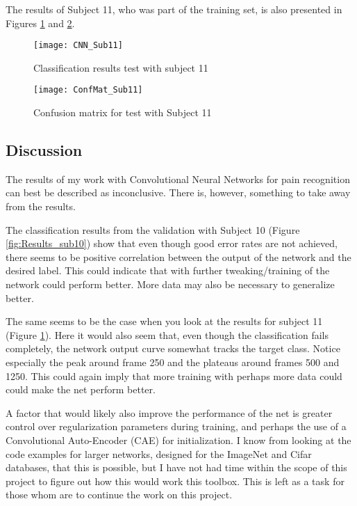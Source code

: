 \documentclass[Main]{subfiles}
\begin{document}
		The results of Subject 11, who was part of the training set, is also presented in Figures \ref{fig:Results_sub11} and \ref{fig:cnn_conf11}.

		\begin{figure}[H]
			\begin{center}
				\texttt{[image: CNN\_Sub11]}
			\end{center}
			\caption{Classification results test with subject 11}
			\label{fig:Results_sub11}
		\end{figure}

		\begin{figure}[H]
			\begin{center}
				\texttt{[image: ConfMat\_Sub11]}
			\end{center}
			\caption{Confusion matrix for test with Subject 11}
			\label{fig:cnn_conf11}
		\end{figure}

	\subsection{Discussion} %
		\label{sub:cnn_discussion}
		The results of my work with Convolutional Neural Networks for pain recognition can best be described as inconclusive.
		There is, however, something to take away from the results.

		The classification results from the validation with Subject 10 (Figure \ref{fig:Results_sub10}) show that even though good error rates are not achieved, there seems to be positive correlation between the output of the network and the desired label.
		This could indicate that with further tweaking/training of the network could perform better.
		More data may also be necessary to generalize better.

		The same seems to be the case when you look at the results for subject 11 (Figure \ref{fig:Results_sub11}).
		Here it would also seem that, even though the classification fails completely, the network output curve somewhat tracks the target class.
		Notice especially the peak around frame 250 and the plateaus around frames 500 and 1250.
		This could again imply that more training with perhaps more data could could make the net perform better.

		A factor that would likely also improve the performance of the net is greater control over regularization parameters during training, and perhaps the use of a Convolutional Auto-Encoder (CAE) for initialization.
		I know from looking at the code examples for larger networks, designed for the ImageNet \cite{Deng09imagenet:a} and Cifar \cite{Krizhevsky09cifar} databases, that this is possible, but I have not had time within the scope of this project to figure out how this would work this toolbox.
		This is left as a task for those whom are to continue the work on this project.


\end{document}
